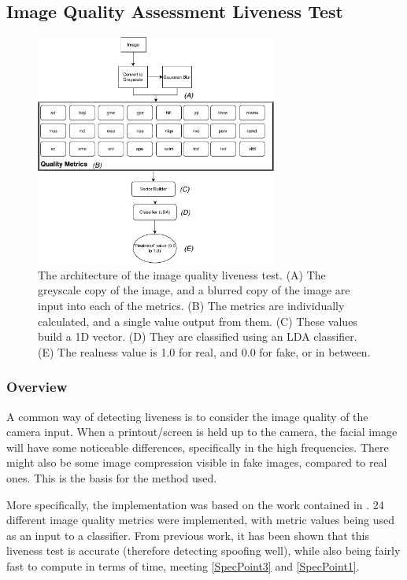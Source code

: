 \documentclass[12pt,a4paper]{article}
\begin{document}
        \subsection{Image Quality Assessment Liveness Test}
           \begin{figure}
                \centering
                \includegraphics[width=300px]{ImageQualityLivenessTest.pdf}
                \caption{The architecture of the image quality liveness test. (A) The greyscale copy of the image, and a blurred copy of the image are input into each of the metrics.
                (B) The metrics are individually calculated, and a single value output from them. (C) These values build a 1D vector. (D) They are classified using an LDA classifier. (E) The realness value
                is 1.0 for real, and 0.0 for fake, or in between.}
                \label{ImageQualityLivenessTestDiagram}
            \end{figure}

            \subsubsection{Overview}
            A common way of detecting liveness is to consider the image quality of the camera input. When a printout/screen is held up to the camera, the facial image
            will have some noticeable differences, specifically in the high frequencies. There might also be some image compression visible in fake images, compared to real ones.
            This is the basis for the method used.

            More specifically, the implementation was based on the work contained in \cite{ImageQualityAssessmentTest}. 24 different image quality metrics were implemented,
            with metric values being used as an input to a classifier. From previous work, it has been shown that this liveness test is accurate (therefore detecting spoofing well), while also being fairly fast to compute in terms of time, meeting \ref{SpecPoint3} and \ref{SpecPoint1}.
\end{document}
